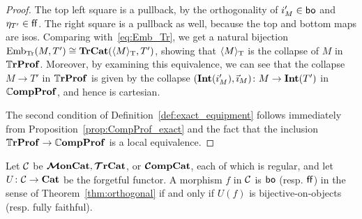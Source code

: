 \documentclass[12pt,oneside,article,draft]{memoir}
\begin{document}
\begin{proof}
   The top left square is a pullback, by the orthogonality of $i'_M\in\mathsf{bo}$ and $\eta_{T'}\in\mathsf{ff}$.
   The right square is a pullback as well, because the top and bottom maps are isos. Comparing with~\eqref{eq:Emb_Tr}, we get a natural bijection
   $\mathrm{Emb}_{\mathrm{Tr}}(M,T')\cong\mathbf{TrCat}(\langle M\rangle_{\textrm{T}},T')$, showing that $\langle M\rangle_{\textrm{T}}$ is the collapse of
   $M$ in $\mathbb{T}\mathbf{rProf}$. Moreover, by examining this equivalence, we can see that the collapse $M\to
   T'$ in $\mathbb{T}\mathbf{rProf}$ is given by the collapse $(\mathbf{Int}(i'_M),\vec{\imath}_M)\colon M\to\mathbf{Int}(T')$ in
   $\mathbb{C}\mathbf{ompProf}$, and hence is cartesian.

   The second condition of Definition~\ref{def:exact_equipment} follows immediately from Proposition~\ref{prop:CompProf_exact} and the fact that the inclusion $\mathbb{T}\mathbf{rProf}\to\mathbb{C}\mathbf{ompProf}$ is a local equivalence.
\end{proof}

\begin{proposition}\label{prop:boff_well_named}
Let $\mathcal{C}$ be $\bm{\mathcal{M}}\mathbf{onCat}, \bm{\mathcal{T}}\mathbf{rCat}$, or $\bm{\mathcal{C}}\mathbf{ompCat}$, each of which is regular, and let $U\colon\mathcal{C}\to\mathbf{Cat}$ be the forgetful functor. A morphism $f$ in $\mathcal{C}$ is $\mathsf{bo}$ (resp. $\mathsf{ff}$) in the sense of Theorem~\ref{thm:orthogonal} if and only if $U(f)$ is bijective-on-objects (resp. fully faithful).
\end{proposition}
\end{document}
